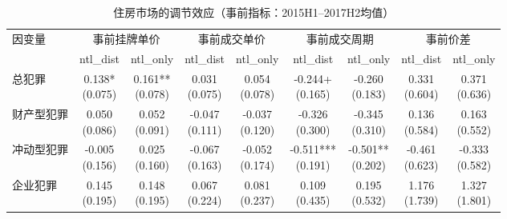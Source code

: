 \documentclass[a4paper,12pt]{report}
\begin{document}
\begin{table}[H]
\centering
\caption{住房市场的调节效应（事前指标：2015H1--2017H2均值）}
\label{tab:mod_house_pre1517}
\begin{adjustbox}{width=\textwidth,center}
\begin{tabular}{lcccccccc}
\toprule
\multirow{2}{*}{因变量} & \multicolumn{2}{c}{事前挂牌单价} & \multicolumn{2}{c}{事前成交单价} & \multicolumn{2}{c}{事前成交周期} & \multicolumn{2}{c}{事前价差} \\
\cmidrule(lr){2-3}\cmidrule(lr){4-5}\cmidrule(lr){6-7}\cmidrule(lr){8-9}
  & ntl\_dist & ntl\_only & ntl\_dist & ntl\_only & ntl\_dist & ntl\_only & ntl\_dist & ntl\_only \\
\midrule
总犯罪 & \makecell{0.138*\\(0.075)} & \makecell{0.161**\\(0.078)} & \makecell{0.031\\(0.075)} & \makecell{0.054\\(0.078)} & \makecell{-0.244+\\(0.165)} & \makecell{-0.260\\(0.183)} & \makecell{0.331\\(0.604)} & \makecell{0.371\\(0.636)} \\
财产型犯罪 & \makecell{0.050\\(0.086)} & \makecell{0.052\\(0.091)} & \makecell{-0.047\\(0.111)} & \makecell{-0.037\\(0.120)} & \makecell{-0.326\\(0.300)} & \makecell{-0.345\\(0.310)} & \makecell{0.136\\(0.584)} & \makecell{0.163\\(0.552)} \\
冲动型犯罪 & \makecell{-0.005\\(0.156)} & \makecell{0.025\\(0.160)} & \makecell{-0.067\\(0.163)} & \makecell{-0.052\\(0.174)} & \makecell{-0.511***\\(0.191)} & \makecell{-0.501**\\(0.202)} & \makecell{-0.461\\(0.623)} & \makecell{-0.333\\(0.582)} \\
企业犯罪 & \makecell{0.145\\(0.195)} & \makecell{0.148\\(0.195)} & \makecell{0.067\\(0.224)} & \makecell{0.081\\(0.237)} & \makecell{0.109\\(0.435)} & \makecell{0.195\\(0.532)} & \makecell{1.176\\(1.739)} & \makecell{1.327\\(1.801)} \\

\end{tabular}
\end{adjustbox}
\end{table}
\end{document}
